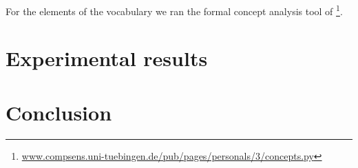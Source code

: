 \documentclass[11pt,a4paper]{article}
\begin{document}
For the elements of the vocabulary we ran the formal concept analysis tool of \citet{2010378} \footnote{\url{www.compsens.uni-tuebingen.de/pub/pages/personals/3/concepts.py}}.

\section{Experimental results}

\section{Conclusion}


\end{document}
